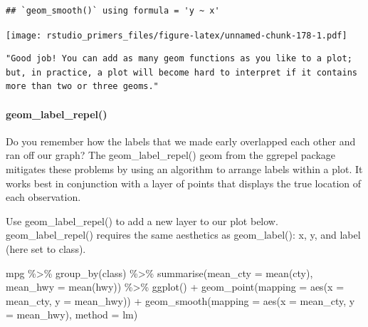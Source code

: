 \documentclass[
]{article}
\newenvironment{Shaded}{\begin{snugshade}}{\end{snugshade}}
\newcommand{\AttributeTok}[1]{\textcolor[rgb]{0.77,0.63,0.00}{#1}}
\newcommand{\FunctionTok}[1]{\textcolor[rgb]{0.00,0.00,0.00}{#1}}
\newcommand{\NormalTok}[1]{#1}
\newcommand{\SpecialCharTok}[1]{\textcolor[rgb]{0.00,0.00,0.00}{#1}}
\begin{document}
\begin{verbatim}
## `geom_smooth()` using formula = 'y ~ x'
\end{verbatim}

\texttt{[image: rstudio\_primers\_files/figure-latex/unnamed-chunk-178-1.pdf]}

\begin{verbatim}
"Good job! You can add as many geom functions as you like to a plot; but, in practice, a plot will become hard to interpret if it contains more than two or three geoms."
\end{verbatim}

\hypertarget{geom_label_repel}{%
\paragraph{geom\_label\_repel()}\label{geom_label_repel}}

Do you remember how the labels that we made early overlapped each other
and ran off our graph? The geom\_label\_repel() geom from the ggrepel
package mitigates these problems by using an algorithm to arrange labels
within a plot. It works best in conjunction with a layer of points that
displays the true location of each observation.

Use geom\_label\_repel() to add a new layer to our plot below.
geom\_label\_repel() requires the same aesthetics as geom\_label(): x,
y, and label (here set to class).

\begin{Shaded}
\begin{Highlighting}[]
\NormalTok{mpg }\SpecialCharTok{\%\textgreater{}\%} 
  \FunctionTok{group\_by}\NormalTok{(class) }\SpecialCharTok{\%\textgreater{}\%} 
  \FunctionTok{summarise}\NormalTok{(}\AttributeTok{mean\_cty =} \FunctionTok{mean}\NormalTok{(cty), }\AttributeTok{mean\_hwy =} \FunctionTok{mean}\NormalTok{(hwy)) }\SpecialCharTok{\%\textgreater{}\%} 
  \FunctionTok{ggplot}\NormalTok{() }\SpecialCharTok{+}
    \FunctionTok{geom\_point}\NormalTok{(}\AttributeTok{mapping =} \FunctionTok{aes}\NormalTok{(}\AttributeTok{x =}\NormalTok{ mean\_cty, }\AttributeTok{y =}\NormalTok{ mean\_hwy)) }\SpecialCharTok{+}
    \FunctionTok{geom\_smooth}\NormalTok{(}\AttributeTok{mapping =} \FunctionTok{aes}\NormalTok{(}\AttributeTok{x =}\NormalTok{ mean\_cty, }\AttributeTok{y =}\NormalTok{ mean\_hwy), }\AttributeTok{method =}\NormalTok{ lm)}
\end{Highlighting}
\end{Shaded}
\end{document}
